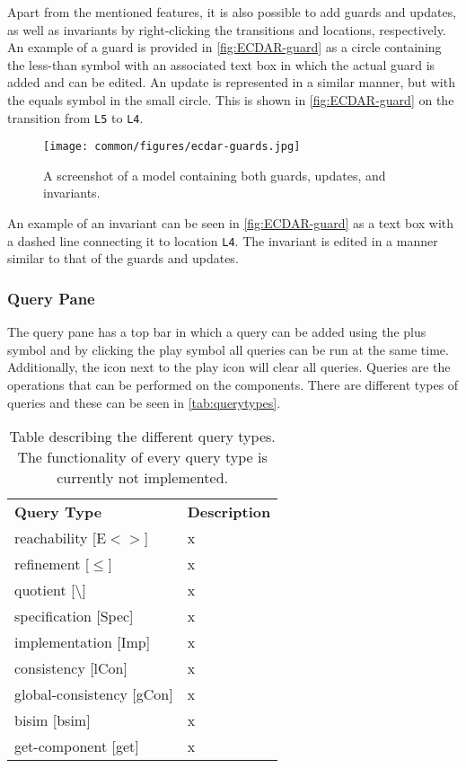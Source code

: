 Apart from the mentioned features, it is also possible to add guards and updates, as well as invariants by right-clicking the transitions and locations, respectively. An example of a guard is provided in \autoref{fig:ECDAR-guard} as a circle containing the less-than symbol with an associated text box in which the actual guard is added and can be edited. 
An update is represented in a similar manner, but with the equals symbol in the small circle. This is shown in \autoref{fig:ECDAR-guard} on the transition from \texttt{L5} to \texttt{L4}.

\begin{figure}[H]
    \centering
    \texttt{[image: common/figures/ecdar-guards.jpg]}
    \caption{A screenshot of a model containing both guards, updates, and invariants.}
    \label{fig:ECDAR-guard}
\end{figure}

An example of an invariant can be seen in \autoref{fig:ECDAR-guard} as a text box with a dashed line connecting it to location \texttt{L4}. The invariant is edited in a manner similar to that of the guards and updates. 


\subsubsection{Query Pane}
The query pane has a top bar in which a query can be added using the plus symbol and by clicking the play symbol all queries can be run at the same time. Additionally, the icon next to the play icon will clear all queries. Queries are the operations that can be performed on the components. There are different types of queries and these can be seen in \autoref{tab:querytypes}. 

\begin{table}[H]
\begin{tabular}{ll}
\textbf{Query Type} & \textbf{Description} \\
reachability [E$<>$]     & x                    \\
refinement [$\leq$]      & x                    \\
quotient [\textbackslash]& x                    \\
specification [Spec]     & x                    \\
implementation [Imp]     & x                    \\
consistency [lCon]       & x                    \\
global-consistency [gCon]& x                    \\
bisim [bsim]             & x                    \\
get-component [get]      & x                    \\
\end{tabular}
\caption{\label{tab:querytypes}Table describing the different query types. The functionality of every query type is currently not implemented.}
\end{table}

